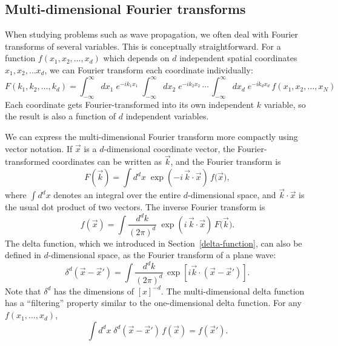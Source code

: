 \documentclass[10pt,a4paper]{article}
\begin{document}
\subsection{Multi-dimensional Fourier transforms}
\label{multi-dimensional-fourier-transforms}

When studying problems such as wave propagation, we often deal with
Fourier transforms of several variables. This is conceptually
straightforward. For a function $f(x_1, x_2, \dots, x_d)$ which
depends on $d$ independent spatial coordinates $x_1, x_2, \dots x_d$,
we can Fourier transform each coordinate individually:
\begin{equation}
F(k_1, k_2, \dots, k_d) = \int_{-\infty}^\infty dx_1\; e^{-ik_1x_1}\; \int_{-\infty}^\infty dx_2\; e^{-ik_2x_2}\,\cdots\, \int_{-\infty}^\infty dx_d\; e^{-ik_d x_d}\, f(x_1,x_2, \dots,x_N)
\end{equation}
Each coordinate gets Fourier-transformed into its own independent $k$
variable, so the result is also a function of $d$ independent
variables.

We can express the multi-dimensional Fourier transform more compactly
using vector notation. If $\vec{x}$ is a $d$-dimensional coordinate
vector, the Fourier-transformed coordinates can be written as
$\vec{k}$, and the Fourier transform is
\begin{equation}
F(\vec{k}) = \int d^d x \; \exp\left(-i\,\vec{k}\cdot\vec{x}\right) \, f\big(\vec{x}\big),
\end{equation}
where $\int d^d x$ denotes an integral over the entire
$d$-dimensional space, and $\vec{k}\cdot\vec{x}$ is the usual dot
product of two vectors. The inverse Fourier transform is
\begin{equation}
f(\vec{x}) = \int \frac{d^dk}{(2\pi)^d}\; \exp\left(i\,\vec{k}\cdot\vec{x}\right)\, F\big(\vec{k}\big).
\end{equation}
The delta function, which we introduced in
Section~\ref{delta-function}, can also be defined in $d$-dimensional
space, as the Fourier transform of a plane wave:
\begin{equation}
\delta^d(\vec{x}-\vec{x}') = \int \frac{d^dk}{(2\pi)^d} \, \exp\left[i\vec{k} \cdot \left(\vec{x}-\vec{x}'\right)\right].
\end{equation}
Note that $\delta^d$ has the dimensions of $[x]^{-d}$. The
multi-dimensional delta function has a ``filtering'' property similar
to the one-dimensional delta function. For any $f(x_1,\dots,x_d)$,
\begin{equation}
\int d^dx \; \delta^d(\vec{x}-\vec{x}') \, f(\vec{x}) = f(\vec{x}').
\end{equation}
\end{document}

